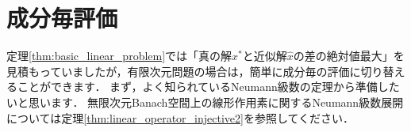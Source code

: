 \section{成分毎評価}\label{sec:element_basic_linear_problem}
定理\ref{thm:basic_linear_problem}では「真の解$x^*$と近似解$\hat{x}$の差の絶対値最大」を見積もっていましたが，有限次元問題の場合は，簡単に成分毎の評価に切り替えることができます．
まず，よく知られているNeumann級数の定理から準備したいと思います．
無限次元Banach空間上の線形作用素に関するNeumann級数展開については定理\ref{thm:linear_operator_injective2}を参照してください．

